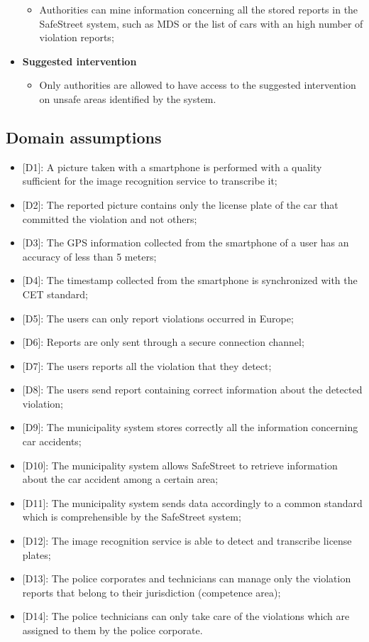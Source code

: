 \begin{itemize}
\begin{itemize}
            \item Authorities can mine information concerning all the stored reports in the SafeStreet system, such as MDS or the list of cars with an high number of violation reports;
        \end{itemize}
    \item \textbf{Suggested intervention}
        \begin{itemize}
            \item Only authorities are allowed to have access to the suggested intervention on unsafe areas identified by the system.
        \end{itemize}
    \end{itemize}
\subsection{Domain assumptions}
\begin{itemize}
    \item {[D1]}: A picture taken with a smartphone is performed with a quality sufficient for the image recognition service to transcribe it;
    \item {[D2]}: The reported picture contains only the license plate of the car that committed the violation and not others;
    \item {[D3]}: The GPS information collected from the smartphone of a user has an accuracy of less than 5 meters;
    \item {[D4]}: The timestamp collected from the smartphone is synchronized with the CET standard;
    \item {[D5]}: The users can only report violations occurred in Europe;
    \item {[D6]}: Reports are only sent through a secure connection channel;
    \item {[D7]}: The users reports all the violation that they detect;
    \item {[D8]}: The users send report containing correct information about the detected violation;
    \item {[D9]}: The municipality system stores correctly all the information concerning car accidents;
    \item {[D10]}: The municipality system allows SafeStreet to retrieve information about the car accident among a certain area;
    \item {[D11]}: The municipality system sends data accordingly to a common standard which is comprehensible by the SafeStreet system;
    \item {[D12]}: The image recognition service is able to detect and transcribe license plates;
    \item {[D13]}: The police corporates and technicians can manage only the violation reports that belong to their jurisdiction (competence area);
    \item {[D14]}: The police technicians can only take care of the violations which are assigned to them by the police corporate.
\end{itemize}
